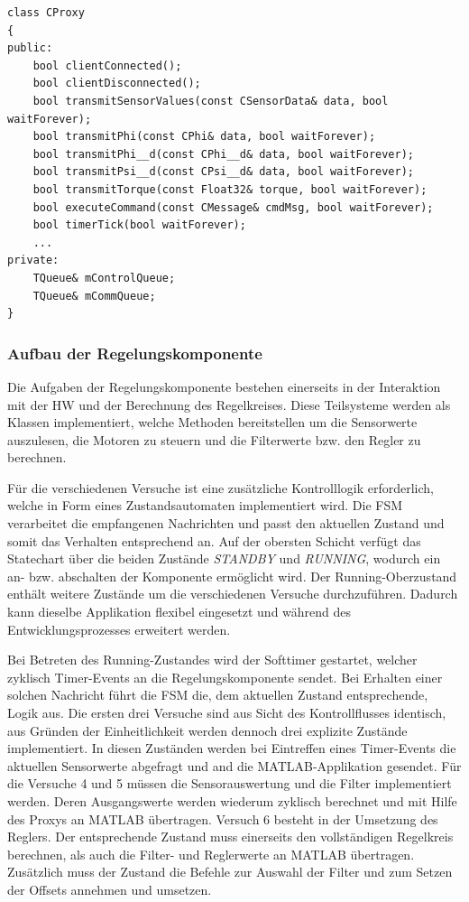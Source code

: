 \documentclass{article}
\begin{document}
\begin{lstlisting}
class CProxy
{
public:
	bool clientConnected();
	bool clientDisconnected();
	bool transmitSensorValues(const CSensorData& data, bool waitForever);
	bool transmitPhi(const CPhi& data, bool waitForever);
	bool transmitPhi__d(const CPhi__d& data, bool waitForever);
	bool transmitPsi__d(const CPsi__d& data, bool waitForever);
	bool transmitTorque(const Float32& torque, bool waitForever);
	bool executeCommand(const CMessage& cmdMsg, bool waitForever);
	bool timerTick(bool waitForever);
	...
private:
	TQueue& mControlQueue;
	TQueue& mCommQueue;
}
\end{lstlisting}

\subsubsection{Aufbau der Regelungskomponente}
Die Aufgaben der Regelungskomponente bestehen einerseits in der Interaktion mit der HW und der Berechnung des Regelkreises. Diese Teilsysteme werden als Klassen implementiert, welche Methoden bereitstellen um die Sensorwerte auszulesen, die Motoren zu steuern und die Filterwerte bzw. den Regler zu berechnen.


Für die verschiedenen Versuche ist eine zusätzliche Kontrolllogik erforderlich, welche in Form eines Zustandsautomaten implementiert wird. Die FSM verarbeitet die empfangenen Nachrichten und passt den aktuellen Zustand und somit das Verhalten entsprechend an. Auf der obersten Schicht verfügt das Statechart über die beiden Zustände \textit{STANDBY} und \textit{RUNNING}, wodurch ein an- bzw. abschalten der Komponente ermöglicht wird. Der Running-Oberzustand enthält weitere Zustände um die verschiedenen Versuche durchzuführen. Dadurch kann dieselbe Applikation flexibel eingesetzt und während des Entwicklungsprozesses erweitert werden.


Bei Betreten des Running-Zustandes wird der Softtimer gestartet, welcher zyklisch Timer-Events an die Regelungskomponente sendet. Bei Erhalten einer solchen Nachricht führt die FSM die, dem aktuellen Zustand entsprechende, Logik aus. 
Die ersten drei Versuche sind aus Sicht des Kontrollflusses identisch, aus Gründen der Einheitlichkeit werden dennoch drei explizite Zustände implementiert. In diesen Zuständen werden bei Eintreffen eines Timer-Events die aktuellen Sensorwerte abgefragt und and die MATLAB-Applikation gesendet. Für die Versuche 4 und 5 müssen die Sensorauswertung und die Filter implementiert werden. Deren Ausgangswerte werden wiederum zyklisch berechnet und mit Hilfe des Proxys an MATLAB übertragen. Versuch 6 besteht in der Umsetzung des Reglers. Der entsprechende Zustand muss einerseits den vollständigen Regelkreis berechnen, als auch die Filter- und Reglerwerte an MATLAB übertragen. Zusätzlich muss der Zustand die Befehle zur Auswahl der Filter und zum Setzen der Offsets annehmen und umsetzen.
\end{document}
